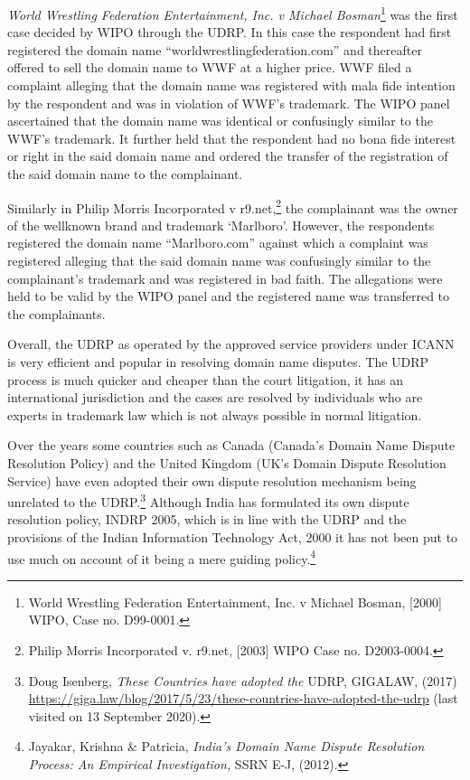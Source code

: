 \begin{multicols}{2}
\noi
\textit{World Wrestling Federation Entertainment, Inc. v Michael Bosman}\footnote{World Wrestling Federation Entertainment, Inc. v Michael Bosman, [2000] WIPO, Case no. D99-0001.} was the first case
decided by WIPO through the UDRP. In this case the respondent had first registered the
domain name “worldwrestlingfederation.com” and thereafter offered to sell the domain name
to WWF at a higher price. WWF filed a complaint alleging that the domain name was
registered with mala fide intention by the respondent and was in violation of WWF’s
trademark. The WIPO panel ascertained that the domain name was identical or confusingly
similar to the WWF’s trademark. It further held that the respondent had no bona fide interest
or right in the said domain name and ordered the transfer of the registration of the said
domain name to the complainant.

\noi
Similarly in Philip Morris Incorporated v r9.net,\footnote{Philip Morris Incorporated v. r9.net, [2003] WIPO Case no. D2003-0004.} the complainant was the owner of the wellknown brand and trademark ‘Marlboro’. However, the respondents registered the domain
name “Marlboro.com” against which a complaint was registered alleging that the said domain
name was confusingly similar to the complainant’s trademark and was registered in bad faith.
The allegations were held to be valid by the WIPO panel and the registered name was
transferred to the complainants.

\noi
Overall, the UDRP as operated by the approved service providers under ICANN is very
efficient and popular in resolving domain name disputes. The UDRP process is much quicker
and cheaper than the court litigation, it has an international jurisdiction and the cases are
resolved by individuals who are experts in trademark law which is not always possible in
normal litigation.

\noi
Over the years some countries such as Canada (Canada’s Domain Name Dispute Resolution
Policy) and the United Kingdom (UK’s Domain Dispute Resolution Service) have even
adopted their own dispute resolution mechanism being unrelated to the UDRP.\footnote{Doug Isenberg, \textit{These Countries have adopted the} UDRP, GIGALAW, (2017)  \url{https://giga.law/blog/2017/5/23/these-countries-have-adopted-the-udrp} (last visited on 13 September 2020). } Although India has formulated its own dispute resolution policy, INDRP 2005, which is in line with the
UDRP and the provisions of the Indian Information Technology Act, 2000 it has not been put
to use much on account of it being a mere guiding policy.\footnote{Jayakar, Krishna \& Patricia, \textit{India’s Domain Name Dispute Resolution Process: An Empirical Investigation,} SSRN E-J, (2012).}


\end{multicols}
